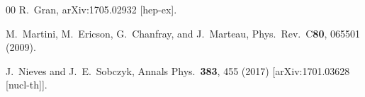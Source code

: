 \documentclass[aps,prl,twocolumn,superscriptaddress,nofootinbib]{revtex4}
\begin{document}
\begin{thebibliography}{00}
  R.~Gran,
  arXiv:1705.02932 [hep-ex].
  
  M.~Martini, M.~Ericson, G.~Chanfray, and J.~Marteau,
  Phys.\ Rev.\ C{\bf 80}, 065501 (2009).

  J.~Nieves and J.~E.~Sobczyk,
  Annals Phys.\  {\bf 383}, 455 (2017)
  [arXiv:1701.03628 [nucl-th]].


  
  
  
  

\end{thebibliography}
\end{document}
